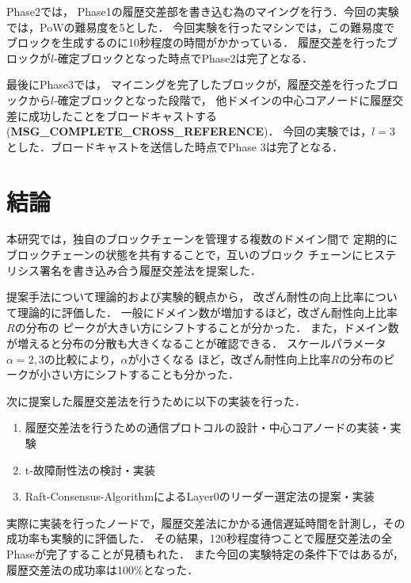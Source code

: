 \documentclass[a4paper,12pt]{jsarticle}
\begin{document}
Phase2では，
Phase1の履歴交差部を書き込む為のマイングを行う．今回の実験では，PoWの難易度を5とした．
今回実験を行ったマシンでは，この難易度でブロックを生成するのに10秒程度の時間がかかっている．
履歴交差を行ったブロックが$l$-確定ブロックとなった時点でPhase2は完了となる．

最後にPhase3では，
マイニングを完了したブロックが，履歴交差を行ったブロックから$l$-確定ブロックとなった段階で，
他ドメインの中心コアノードに履歴交差に成功したことをブロードキャストする
 (\textbf{MSG\_COMPLETE\_CROSS\_REFERENCE})．
今回の実験では，$l=3$とした．ブロードキャストを送信した時点でPhase 3は完了となる．
\newpage
\section{結論}
本研究では，独自のブロックチェーンを管理する複数のドメイン間で
定期的にブロックチェーンの状態を共有することで，互いのブロック
チェーンにヒステリシス署名を書き込み合う履歴交差法を提案した．

提案手法について理論的および実験的観点から，
改ざん耐性の向上比率について理論的に評価した．
一般にドメイン数が増加するほど，改ざん耐性向上比率$R$の分布の
ピークが大きい方にシフトすることが分かった．
また，ドメイン数が増えると分布の分散も大きくなることが確認できる．
スケールパラメータ$\alpha=2,3$の比較により，$\alpha$が小さくなる
ほど，改ざん耐性向上比率$R$の分布のピークが小さい方にシフトすることも分かった．

次に提案した履歴交差法を行うために以下の実装を行った．
\begin{enumerate}
  \item 履歴交差法を行うための通信プロトコルの設計・中心コアノードの実装・実験\\
  \hspace{12mm}
  \item t-故障耐性法の検討・実装\\
  \hspace{12mm}
  \item Raft-Consensus-AlgorithmによるLayer0のリーダー選定法の提案・実装\\
  \hspace{12mm}
\end{enumerate}

実際に実装を行ったノードで，履歴交差法にかかる通信遅延時間を計測し，その成功率も実験的に評価した．
その結果，120秒程度待つことで履歴交差法の全Phaseが完了することが見積もれた．
また今回の実験特定の条件下ではあるが，履歴交差法の成功率は100\%となった．
\end{document}
